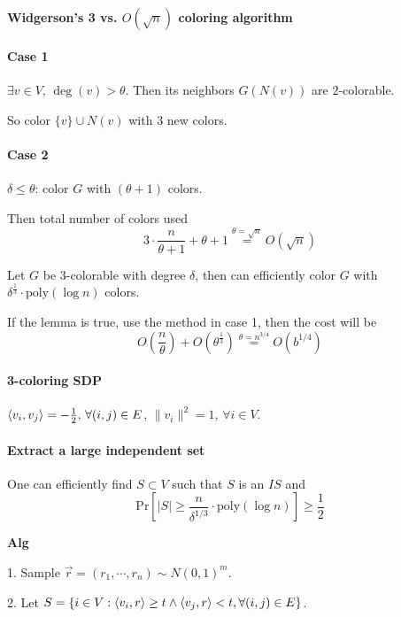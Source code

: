 \paragraph{Widgerson's 3 vs.  $ O(\sqrt{n}) $ coloring algorithm}

\paragraph{Case 1}  $ \exists v\in V $,  $ \deg(v)>\theta $. Then its neighbors  $ G(N(v)) $ are  $ 2 $-colorable.

So color  $ \{v\}\cup N(v) $ with  $ 3 $ new colors.

\paragraph{Case 2}  $ \delta \leq \theta $: color  $ G $ with  $ (\theta+1) $ colors.

Then total number of colors used 
\[3\cdot\frac{n}{\theta+1}+\theta+1\overset{\theta=\sqrt{n }}{=}O(\sqrt{n})\]

\begin{lemma}
    Let  $ G $ be  $ 3 $-colorable with degree  $ \delta $, then can efficiently color  $ G $ with   $ \delta^{\frac{1}{3}}\cdot \mathrm{poly}(\log n) $ colors.  
\end{lemma}

If the lemma is true, use the method in case 1, then the cost will be 
\[O(\frac{n}{\theta})+O(\theta^{\frac{1}{3}})\overset{\theta=n^{3/4}}{=}O(b^{1/4})\]
\paragraph{3-coloring SDP}  $ \left<v_i,v_j\right>=-\frac{1}{2},\,\forall (i,j)\in E $,  $ \|v_i\|^2=1 $,  $ \forall i\in V $.

\paragraph{Extract a large independent set}

One can efficiently find  $ S\subset V $ such that  $ S $ is an  $ IS $ and 
\[\mathrm{Pr}[|S| \geq \frac{n}{\delta^{1/3}}\cdot \mathrm{poly}(\log n)] \geq \frac{1}{2}\] 

\textbf{Alg}

1. Sample  $ \vec{r}=(r_1,\cdots,r_n)\sim N(0,1)^m$.

2. Let  $ S=\{i\in V:\left<v_i,r\right> \geq t\wedge \left<v_j,r\right><t,\forall (i,j)\in E\} $.

